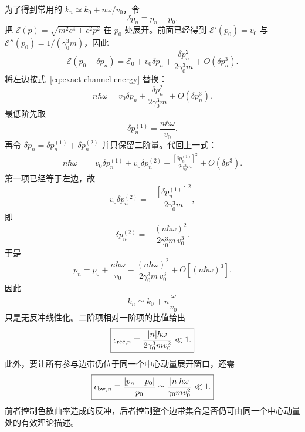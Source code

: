 为了得到常用的 $k_n\simeq k_0+n\omega/v_0$，令
\begin{equation}
\delta p_n\equiv p_n-p_0.
\end{equation}
把
\(
\mathcal E(p)=\sqrt{m^2c^4+c^2p^2}
\)
在 $p_0$ 处展开。前面已经得到
\(
\mathcal E'(p_0)=v_0
\)
与
\(
\mathcal E''(p_0)=1/(\gamma_0^3m)
\)，因此
\begin{equation}
\mathcal E(p_0+\delta p_n)
=\mathcal E_0
+v_0\delta p_n
+\frac{\delta p_n^2}{2\gamma_0^3m}
+O(\delta p_n^3).
\label{eq:dispersion-channel-expand}
\end{equation}
将左边按式~\eqref{eq:exact-channel-energy} 替换：
\begin{equation}
n\hbar\omega
=v_0\delta p_n
+\frac{\delta p_n^2}{2\gamma_0^3m}
+O(\delta p_n^3).
\label{eq:channel-energy-balance-expanded}
\end{equation}
最低阶先取
\begin{equation}
\delta p_n^{(1)}=\frac{n\hbar\omega}{v_0}.
\end{equation}
再令
\(
\delta p_n=\delta p_n^{(1)}+\delta p_n^{(2)}
\)
并只保留二阶量。代回上一式：
\begin{align}
n\hbar\omega
&=v_0\delta p_n^{(1)}
+v_0\delta p_n^{(2)}
+\frac{[\delta p_n^{(1)}]^2}{2\gamma_0^3m}
+O(\delta p^3).
\end{align}
第一项已经等于左边，故
\begin{equation}
v_0\delta p_n^{(2)}
=-\frac{[\delta p_n^{(1)}]^2}{2\gamma_0^3m},
\end{equation}
即
\begin{equation}
\delta p_n^{(2)}
=-\frac{(n\hbar\omega)^2}{2\gamma_0^3m\,v_0^3}.
\end{equation}
于是
\begin{equation}
\boxed{
p_n=p_0+\frac{n\hbar\omega}{v_0}
-\frac{(n\hbar\omega)^2}{2\gamma_0^3m\,v_0^3}
+O[(n\hbar\omega)^3].}
\label{eq:channel-momentum-recoil-series}
\end{equation}
因此
\begin{equation}
k_n\simeq k_0+n\frac{\omega}{v_0}
\label{eq:linear-channel-k}
\end{equation}
只是无反冲线性化。二阶项相对一阶项的比值给出
\begin{equation}
\boxed{
\epsilon_{{\rm rec},n}
\equiv
\frac{|n|\hbar\omega}{2\gamma_0^3m v_0^2}\ll1.}
\label{eq:recoil-small-parameter}
\end{equation}
此外，要让所有参与边带仍位于同一个中心动量展开窗口，还需
\begin{equation}
\boxed{
\epsilon_{{\rm bw},n}
\equiv\frac{|p_n-p_0|}{p_0}
\simeq
\frac{|n|\hbar\omega}{\gamma_0m v_0^2}\ll1.}
\label{eq:sideband-bandwidth-condition}
\end{equation}
前者控制色散曲率造成的反冲，后者控制整个边带集合是否仍可由同一个中心动量处的有效理论描述。

